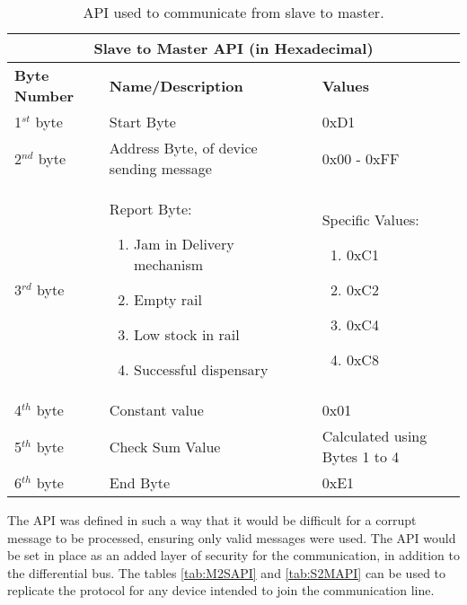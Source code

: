 \documentclass[a4paper,11pt]{article}
\numberwithin{figure}{section}
\numberwithin{table}{section}
\begin{document}
	\begin{center}
		\begin{table}[ht]
			\centering
			\begin{tabular}{| m{3cm} | m{5cm}| m{5cm} |}
			\hline
			\multicolumn{3}{|c|}{\bfseries Slave to Master API (in Hexadecimal)}\\
			\hline
			\bfseries{Byte Number}  & \bfseries{Name/Description} & \bfseries{Values} \\
			\hline
			1$^{st}$ byte & Start Byte & 0xD1\\
			\hline
			2$^{nd}$ byte & Address Byte, of device sending message & 0x00 - 0xFF\\
			\hline
			3$^{rd}$ byte & Report Byte:\begin{enumerate}
											\setlength{\itemsep}{0pt}
   											\setlength{\parskip}{0pt}
    										\setlength{\parsep}{0pt} 
											\item Jam in Delivery mechanism
											\item Empty rail
											\item Low stock in rail
											\item Successful dispensary
										\end{enumerate} & Specific Values: \begin{enumerate}[noitemsep,topsep=0pt]
																				\setlength{\itemsep}{0pt}
   																				\setlength{\parskip}{0pt}
    																			\setlength{\parsep}{0pt} 
																				\item 0xC1
																				\item 0xC2
																				\item 0xC4
																				\item 0xC8
																			\end{enumerate}\\
			\hline
			4$^{th}$ byte & Constant value & 0x01 \\
			\hline
			5$^{th}$ byte & Check Sum Value & Calculated using Bytes 1 to 4\\
			\hline
			6$^{th}$ byte & End Byte & 0xE1 \\
			\hline
			\end{tabular}
		\caption{API used to communicate from slave to master. \label{tab:S2MAPI}}
		\end{table}
	\end{center}

The API was defined in such a way that it would be difficult for a corrupt message to be processed, ensuring only valid messages were used. The API would be set in place as an added layer of security for the communication, in addition to the differential bus. The tables \autoref{tab:M2SAPI} and \autoref{tab:S2MAPI} can be used to replicate the protocol for any device intended to join the communication line.
\end{document}
